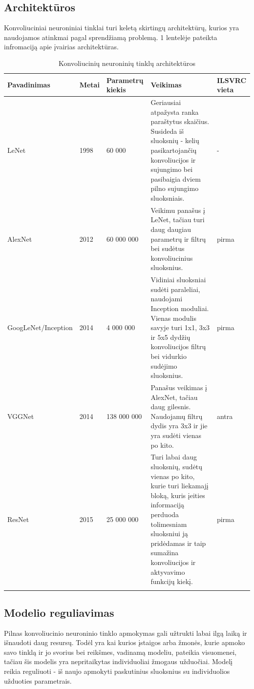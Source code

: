 \documentclass{VUMIFPSkursinis}
\begin{document}
\subsection{Architektūros}
Konvoliuciniai neuroniniai tinklai turi keletą skirtingų architektūrų, kurios yra naudojamos atinkmai pagal sprendžiamą problemą. 1 lentelėje pateikta infromaciją 
apie įvairias architektūras.


\begin{longtable}[h]{ | p{4cm} | p{1cm} | p{3cm} | p{5cm} | p{1.5cm} | } 
\hline
Pavadinimas & Metai & Parametrų kiekis & Veikimas & ILSVRC vieta \\
\hline
LeNet & 1998 & 60 000 & Geriausiai atpažysta ranka paraštytus skaičius. Susideda iš sluoksnių - kelių pasikartojančių konvoliucijos ir sujungimo bei pasibaigia dviem pilno sujungimo sluoksniais. & - \\
\hline
AlexNet & 2012 & 60 000 000 & Veikimu panašus į LeNet, tačiau turi daug daugiau parametrų ir filtrų bei sudėtus konvoliucinius sluoksnius.  & pirma \\
\hline
GoogLeNet/Inception & 2014 & 4 000 000 & Vidiniai sluoksniai sudėti paraleliai, naudojami Inception moduliai. Vienas modulis savyje turi 1x1, 3x3 ir 5x5 dydžių konvoliucijos filtrų bei vidurkio sudėjimo sluoksnius. & pirma \\
\hline
VGGNet & 2014 & 138 000 000 & Panašus veikimas į AlexNet, tačiau daug gilesnis. Naudojamų filtrų dydis yra 3x3 ir jie yra sudėti vienas po kito. & antra \\
\hline
ResNet & 2015 & 25 000 000 & Turi labai daug sluoksnių, sudėtų vienas po kito, kurie turi liekamajį bloką, kuris įeities informaciją perduoda tolimesniam sluoksniui ją pridėdamas ir taip sumažina konvoliucijos ir aktyvavimo funkcijų kiekį.  & pirma \\
\hline
\caption{Konvoliucinių neuroninių tinklų architektūros}
\end{longtable}

\subsection{Modelio reguliavimas}
Pilnas konvoliucinio neuroninio tinklo apmokymas gali užtrukti labai ilgą laiką ir išnaudoti daug resursų. Todėl yra kai kurios įstaigos arba žmonės, kurie apmoko savo 
tinklą ir jo svorius bei reikšmes, vadinamą modeliu, pateikia visuomenei, tačiau šis modelis yra nepritaikytas individuoliai žmogaus užduočiai. Modelį reikia 
reguliuoti - iš naujo apmokyti paskutinius sluoksnius su individuolios užduoties parametrais.
\end{document}

